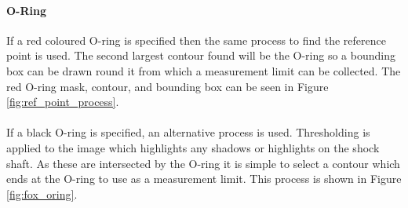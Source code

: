 		\paragraph{O-Ring}
			If a red coloured O-ring is specified then the same process to find the reference point is used. The second largest contour found will be the O-ring so a bounding box can be drawn round it from which a measurement limit can be collected. The red O-ring mask, contour, and bounding box can be seen in Figure \ref{fig:ref_point_process}. 
			\\\\
			If a black O-ring is specified, an alternative process is used. Thresholding is applied to the image which highlights any shadows or highlights on the shock shaft. As these are intersected by the O-ring it is simple to select a contour which ends at the O-ring to use as a  measurement limit. This process is shown in Figure \ref{fig:fox_oring}.
